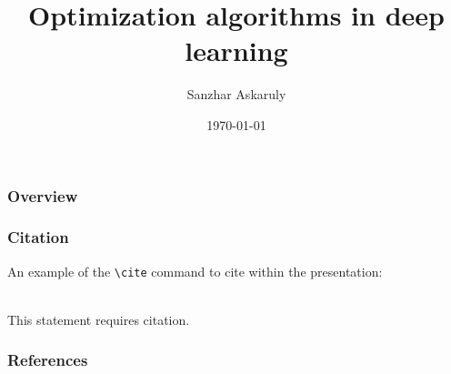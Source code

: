 \documentclass{beamer}
\title[CodeSeoul] %
	{Optimization algorithms in deep learning}
\author[AI Research Paper Review] %
	{Sanzhar Askaruly}
\institute[] %
	{ Ulsan National Institute of Science and Technology\newline
	  Ph.D. Candidate in Biomedical Engineering}
\date{\today}
\begin{document}
    \begin{frame}
    \titlepage %
    \end{frame}

    \begin{frame}
    \frametitle{Overview} %
    \tableofcontents 
    \end{frame}

    \begin{frame}[fragile] %
    \frametitle{Citation}
    An example of the \verb|\cite| command to cite within the presentation:\\~
    
    This statement requires citation.~\cite{test1} 
    \end{frame}


    \begin{frame}[t, allowframebreaks]
    \frametitle{References}
    
    
    \end{frame}
\end{document}
